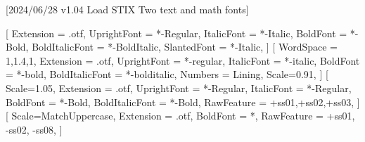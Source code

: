 
[2024/06/28 v1.04 Load STIX Two text and math fonts]

%
%
\ifpdftex
	\RequirePackage[T1]{fontenc}	
	\RequirePackage{bm}
\else
    \RequirePackage[warnings-off={mathtools-colon,mathtools-overbracket}]{unicode-math}
    \setmainfont{STIXTwoText}[%
       	Extension = .otf,
    	UprightFont = *-Regular,
    	ItalicFont = *-Italic,
    	BoldFont = *-Bold,
    	BoldItalicFont = *-BoldItalic,
		SlantedFont = *-Italic,
	]
	\setsansfont{texgyreheros}[%
		WordSpace = {1,1.4,1},
		Extension = .otf,
    	UprightFont = *-regular,
    	ItalicFont = *-italic,
    	BoldFont = *-bold,
    	BoldItalicFont = *-bolditalic,
		Numbers = Lining,
    	Scale=0.91,%
	]        
	\setmonofont{Inconsolatazi4}[%
        Scale=1.05,%
        Extension = .otf,
        UprightFont = *-Regular,
        ItalicFont = *-Regular,%
        BoldFont = *-Bold, 
    	BoldItalicFont = *-Bold,%
        RawFeature = {+ss01,+ss02,+ss03},
    ]             
	[%
    	Scale=MatchUppercase,
    	Extension = .otf,
		BoldFont = *,%
    	RawFeature = {+ss01, -ss02, -ss08},
   ]
   \newcommand*{\FRAC}[1]{{\addfontfeature{Fractions=On}#1}}%
\fi
